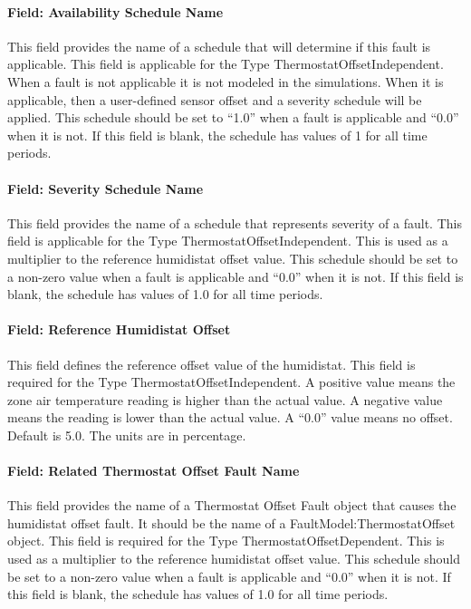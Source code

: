 \paragraph{Field: Availability Schedule Name}\label{field-availability-schedule-name-7-002}

This field provides the name of a schedule that will determine if this fault is applicable. This field is applicable for the Type ThermostatOffsetIndependent. When a fault is not applicable it is not modeled in the simulations. When it is applicable, then a user-defined sensor offset and a severity schedule will be applied. This schedule should be set to ``1.0'' when a fault is applicable and ``0.0'' when it is not. If this field is blank, the schedule has values of 1 for all time periods.

\paragraph{Field: Severity Schedule Name}\label{field-severity-schedule-name-7}

This field provides the name of a schedule that represents severity of a fault. This field is applicable for the Type ThermostatOffsetIndependent. This is used as a multiplier to the reference humidistat offset value. This schedule should be set to a non-zero value when a fault is applicable and ``0.0'' when it is not. If this field is blank, the schedule has values of 1.0 for all time periods.

\paragraph{Field: Reference Humidistat Offset}\label{field-reference-humidistat-offset}

This field defines the reference offset value of the humidistat. This field is required for the Type ThermostatOffsetIndependent. A positive value means the zone air temperature reading is higher than the actual value. A negative value means the reading is lower than the actual value. A ``0.0'' value means no offset. Default is 5.0. The units are in percentage.

\paragraph{Field: Related Thermostat Offset Fault Name}\label{field-related-thermostat-offset-fault-name}

This field provides the name of a Thermostat Offset Fault object that causes the humidistat offset fault. It should be the name of a FaultModel:ThermostatOffset object. This field is required for the Type ThermostatOffsetDependent. This is used as a multiplier to the reference humidistat offset value. This schedule should be set to a non-zero value when a fault is applicable and ``0.0'' when it is not. If this field is blank, the schedule has values of 1.0 for all time periods.

